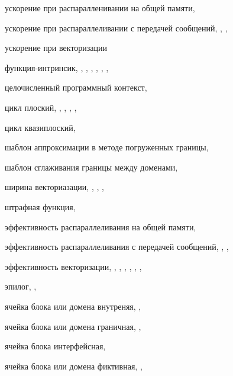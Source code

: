 ускорение при распаралленивании на общей памяти, \pageref{term:shr_speedup}

ускорение при распараллеливании с передачей сообщений, \pageref{term:msg_speedup}, \pageref{term:msg_speedup2}, \pageref{term:msg_speedup3}

ускорение при векторизации

функция-интринсик, \pageref{term:intrinsic}, \pageref{term:intrinsic2}, \pageref{term:intrinsic3}, \pageref{term:intrinsic4}, \pageref{term:intrinsic5}, \pageref{term:intrinsic6}, \pageref{term:intrinsic7}

целочисленный программный контекст, \pageref{term:integer_context}

цикл плоский, \pageref{term:flat_loop}, \pageref{term:flat_loop2}, \pageref{term:flat_loop3}, \pageref{term:flat_loop4}, \pageref{term:flat_loop5}

цикл квазиплоский, \pageref{term:flat_kvazy_flat}

шаблон аппроксимации в методе погруженных границы, \pageref{term:ibm_template}

шаблон сглаживания границы между доменами, \pageref{term:smooth_template}

ширина векториазации, \pageref{term:vec_shir}, \pageref{term:vec_shir2}, \pageref{term:vec_shir3}, \pageref{term:vec_shir4}

штрафная функция, \pageref{term:penalty_function}

эффективность распараллеливания на общей памяти, \pageref{term:shr_eff}

эффективность распараллеливания с передачей сообщений, \pageref{term:msg_eff}, \pageref{term:msg_eff2}, \pageref{term:msg_eff3}

эффективность векторизации, \pageref{term:vec_eff}, \pageref{term:vec_eff2}, \pageref{term:vec_eff3}, \pageref{term:vec_eff4}, \pageref{term:vec_eff5}, \pageref{term:vec_eff6}, \pageref{term:vec_eff7}

эпилог, \pageref{term:epilog}, \pageref{term:epilog2}

ячейка блока или домена внутреняя, \pageref{term:cell_block_inner}, \pageref{term:cell_block_inner2}

ячейка блока или домена граничная, \pageref{term:cell_block_border}, \pageref{term:cell_block_border2}

ячейка блока интерфейсная, \pageref{term:cell_block_interface}

ячейка блока или домена фиктивная, \pageref{term:cell_block_ghost}, \pageref{term:cell_block_ghost2}

